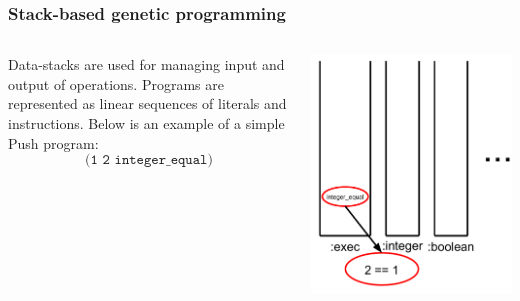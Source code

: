 \documentclass{beamer}
\newcommand{\linespace}{\vskip 0.25cm}
\begin{document}
\begin{frame}
	\frametitle{Stack-based genetic programming}
	\begin{columns}
		\begin{column}{0.6\textwidth}
			Data-stacks are used for managing input and output of operations.
			\linespace
			\linespace
			\linespace
			Programs are represented as linear sequences of literals and instructions. Below is an example of a simple Push program:
			\[\texttt{(1 2 integer\_equal)}\]
		\end{column}
		\begin{column}{0.4\textwidth}
			\includegraphics[height=1.2\textwidth]{Illustrations/stack_8.PDF}
		\end{column}
	\end{columns}
\end{frame}
\end{document}
